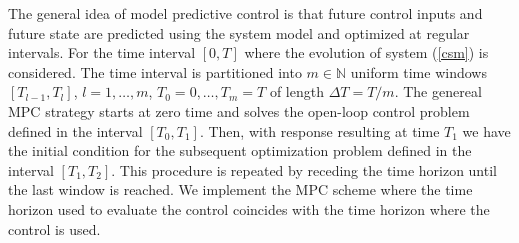 \documentclass[a4paper,10pt, english]{article}
\begin{document}
 
 The general idea of model predictive control is that future control inputs and future state are predicted using the system model and optimized at regular intervals. For
 the time interval $[0, T]$ where the evolution of system (\ref{csm}) is considered. 
 The time interval is partitioned into $m\in \mathbb{N}$ uniform time windows $[T_{l-1}, T_{l}]$, $l = 1, \dots, m$, $T_0 = 0, \dots, T_m = T$  of length  $\Delta T = T/m$. The genereal MPC strategy starts at zero time and solves the open-loop control problem defined in the interval $[T_0, T_1]$. Then, with response  resulting at time $T_1$ we have the initial condition for the subsequent optimization problem defined in the interval $[T_1, T_2]$. This procedure is repeated by receding the time horizon until the last window is reached. We implement the MPC scheme where the time horizon used to evaluate the control coincides with the time horizon where the control is used.
 
\end{document}
